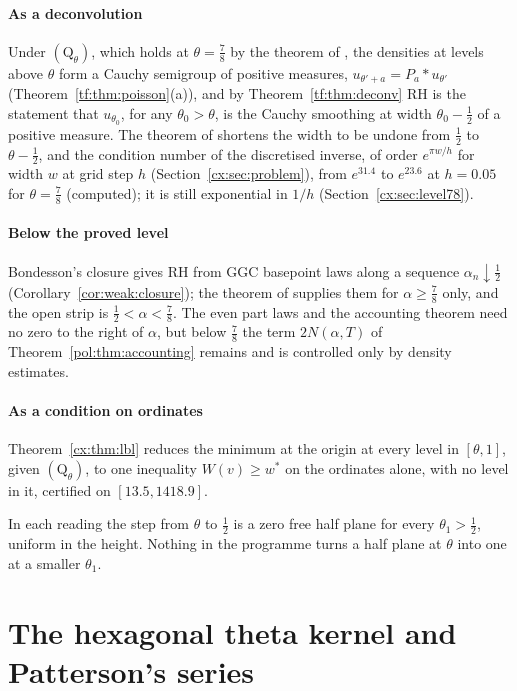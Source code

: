 \paragraph{As a deconvolution} Under $(\mathrm Q_\theta)$, which holds at $\theta=\frac78$ by the theorem of \cite{OAI26a}, the densities at levels above $\theta$ form a Cauchy semigroup of positive measures, $u_{\theta'+a}=P_a*u_{\theta'}$ (Theorem~\ref{tf:thm:poisson}(a)), and by Theorem~\ref{tf:thm:deconv} RH is the statement that $u_{\theta_0}$, for any $\theta_0>\theta$, is the Cauchy smoothing at width $\theta_0-\frac12$ of a positive measure. The theorem of \cite{OAI26a} shortens the width to be undone from $\frac12$ to $\theta-\frac12$, and the condition number of the discretised inverse, of order $e^{\pi w/h}$ for width $w$ at grid step $h$ (Section~\ref{cx:sec:problem}), from $e^{31.4}$ to $e^{23.6}$ at $h=0.05$ for $\theta=\frac78$ (computed); it is still exponential in $1/h$ (Section~\ref{cx:sec:level78}).


\paragraph{Below the proved level} Bondesson's closure gives RH from GGC basepoint laws along a sequence $\alpha_n\downarrow\frac12$ (Corollary~\ref{cor:weak:closure}); the theorem of \cite{OAI26a} supplies them for $\alpha\ge\frac78$ only, and the open strip is $\frac12<\alpha<\frac78$. The even part laws and the accounting theorem need no zero to the right of $\alpha$, but below $\frac78$ the term $2N(\alpha,T)$ of Theorem~\ref{pol:thm:accounting} remains and is controlled only by density estimates.

\paragraph{As a condition on ordinates} Theorem~\ref{cx:thm:lbl} reduces the minimum at the origin at every level in $[\theta,1]$, given $(\mathrm Q_\theta)$, to one inequality $W(v)\ge w^*$ on the ordinates alone, with no level in it, certified on $[13.5,1418.9]$.

In each reading the step from $\theta$ to $\frac12$ is a zero free half plane for every $\theta_1>\frac12$, uniform in the height. Nothing in the programme turns a half plane at $\theta$ into one at a smaller $\theta_1$.

\section{The hexagonal theta kernel and Patterson's series}\label{qrh:sec:hex}

